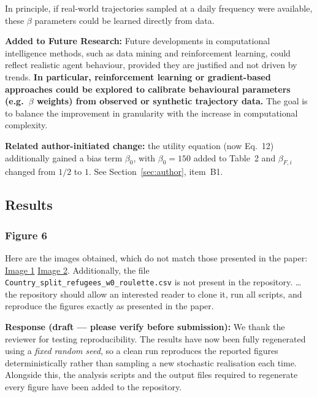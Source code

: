 \documentclass[11pt,a4paper]{article}
\begin{document}
\vspace{0.3cm}
\begin{updatebox}
In principle, if real-world trajectories sampled at a daily frequency were available, these $\beta$ parameters
could be learned directly from data.

\medbreak
\textbf{Added to Future Research:} Future developments in computational intelligence methods, such as data
mining and reinforcement learning, could reflect realistic agent behaviour, provided they are justified and
not driven by trends. \textbf{In particular, reinforcement learning or gradient-based approaches could be
explored to calibrate behavioural parameters (e.g.\ $\beta$ weights) from observed or synthetic trajectory
data.} The goal is to balance the improvement in granularity with the increase in computational complexity.
\end{updatebox}

\vspace{0.2cm}
\begin{authorbox}
\textbf{Related author-initiated change:} the utility equation (now Eq.~12) additionally gained a bias term
$\beta_0$, with $\beta_0=150$ added to Table~2 and $\beta_{F,i}$ changed from $1/2$ to $1$. See
Section~\ref{sec:author}, item~B1.
\end{authorbox}

\subsection*{Results}

\subsubsection*{Figure 6}

\begin{reviewbox}
Here are the images obtained, which do not match those presented in the paper:
\href{https://pasteboard.co/LzLPAUiGF1m9.png}{Image 1} \href{https://pasteboard.co/KUbKqpYE6Ia1.png}{Image 2}.
Additionally, the file \texttt{Country\_split\_refugees\_w0\_roulette.csv} is not present in the repository. \ldots{} the repository should allow an interested reader to clone it, run all scripts, and reproduce the figures exactly as presented in the paper.
\end{reviewbox}

\textbf{Response (draft --- please verify before submission):} We thank the reviewer for testing reproducibility.
The results have now been fully regenerated using a \emph{fixed random seed}, so a clean run reproduces the
reported figures deterministically rather than sampling a new stochastic realisation each time. Alongside this,
the analysis scripts and the output files required to regenerate every figure have been added to the repository.
\end{document}
